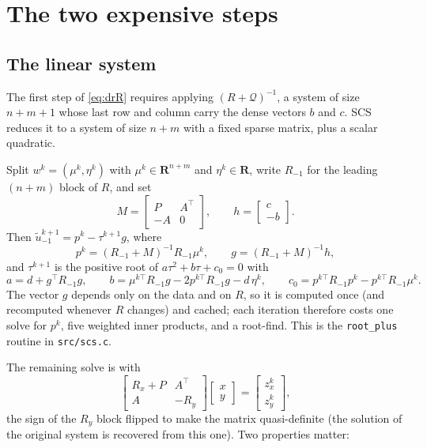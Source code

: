 \documentclass[11pt,a4paper]{article}
\newcommand{\R}{\mathbf{R}}
\newcommand{\Q}{\mathcal{Q}}
\newcommand{\tr}{^\top}
\theoremstyle{plain}
\begin{document}
\section{The two expensive steps}

\subsection{The linear system}\label{sec:linsys}

The first step of \eqref{eq:drR} requires applying $(R + \Q)^{-1}$, a system of
size $n + m + 1$ whose last row and column carry the dense vectors $b$ and $c$.
SCS reduces it to a system of size $n + m$ with a fixed sparse matrix, plus a
scalar quadratic.

Split $w^k = (\mu^k, \eta^k)$ with $\mu^k \in \R^{n+m}$ and
$\eta^k \in \R$, write $R_{-1}$ for the leading $(n+m)$ block of $R$, and set
\begin{equation}
M = \begin{bmatrix} P & A\tr \\ -A & 0 \end{bmatrix},
\qquad
h = \begin{bmatrix} c \\ -b \end{bmatrix} .
\end{equation}
Then $\tilde u^{k+1}_{-1} = p^k - \tau^{k+1} g$, where
\begin{equation}\label{eq:pg}
p^k = (R_{-1} + M)^{-1} R_{-1}\mu^k,
\qquad
g = (R_{-1} + M)^{-1} h ,
\end{equation}
and $\tau^{k+1}$ is the positive root of $a\tau^2 + b\tau + c_0 = 0$ with
\begin{equation}\label{eq:rootplus}
a = d + g\tr R_{-1} g, \qquad
b = \mu^{k\top} R_{-1} g - 2 p^{k\top} R_{-1} g - d\,\eta^k, \qquad
c_0 = p^{k\top} R_{-1} p^k - p^{k\top} R_{-1}\mu^k .
\end{equation}
The vector $g$ depends only on the data and on $R$, so it is computed once
(and recomputed whenever $R$ changes) and cached; each iteration therefore
costs one solve for $p^k$, five weighted inner products, and a root-find. This
is the \texttt{root\_plus} routine in \texttt{src/scs.c}.

The remaining solve is with
\begin{equation}\label{eq:kkt-mat}
\begin{bmatrix} R_x + P & A\tr \\ A & -R_y \end{bmatrix}
\begin{bmatrix} x \\ y \end{bmatrix}
=
\begin{bmatrix} z^k_x \\ z^k_y \end{bmatrix},
\end{equation}
the sign of the $R_y$ block flipped to make the matrix quasi-definite (the
solution of the original system is recovered from this one). Two properties
matter:
\end{document}
